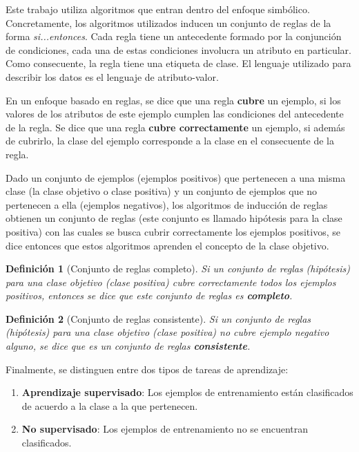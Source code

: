 \documentclass[12pt]{report}
\theoremstyle{break}
\newtheorem{definicion}{Definición}[chapter]
\theoremstyle{break}
\begin{document}
Este trabajo utiliza algoritmos que entran dentro del enfoque simbólico. Concretamente, los algoritmos utilizados inducen un conjunto de reglas de la forma \textit{si...entonces}. Cada regla tiene un antecedente formado por la conjunción de condiciones, cada una de estas condiciones involucra un atributo en particular. Como consecuente, la regla tiene una etiqueta de clase. El lenguaje utilizado para describir los datos es el lenguaje de atributo-valor.

En un enfoque basado en reglas, se dice que una regla \textbf{cubre} un ejemplo, si los valores de los atributos de este ejemplo cumplen las condiciones del antecedente de la regla. Se dice que una regla \textbf{cubre correctamente} un ejemplo, si además de cubrirlo, la clase del ejemplo corresponde a la clase en el consecuente de la regla.

Dado un conjunto de ejemplos (ejemplos positivos) que pertenecen a una misma clase (la clase objetivo o clase positiva) y un conjunto de ejemplos que no pertenecen a ella (ejemplos negativos), los algoritmos de inducción de reglas obtienen un conjunto de reglas (este conjunto es llamado hipótesis para la clase positiva) con las cuales se busca cubrir correctamente los ejemplos positivos, se dice entonces que estos algoritmos aprenden el concepto de la clase objetivo.

\begin{definicion}[Conjunto de reglas completo]
\label{definicion:reglas-completas}
Si un conjunto de reglas (hipótesis) para una clase objetivo (clase positiva) cubre correctamente todos los ejemplos positivos, entonces se dice que este conjunto de reglas es \textbf{completo}.
\end{definicion}

\begin{definicion}[Conjunto de reglas consistente]
\label{definicion:reglas-consistentes}
Si un conjunto de reglas (hipótesis) para una clase objetivo (clase positiva) no cubre ejemplo negativo alguno, se dice que es un conjunto de reglas \textbf{consistente}.
\end{definicion}

Finalmente, se distinguen entre dos tipos de tareas de aprendizaje:

\begin{enumerate}
\item \textbf{Aprendizaje supervisado}: Los ejemplos de entrenamiento están clasificados de acuerdo a la clase a la que pertenecen.

\item \textbf{No supervisado}: Los ejemplos de entrenamiento no se encuentran clasificados.
\end{enumerate}
\end{document}
